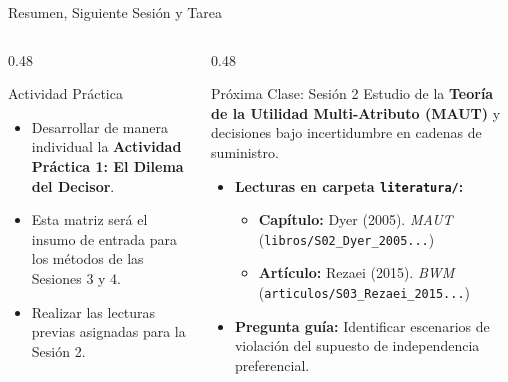 \documentclass[aspectratio=169, 10pt]{beamer}
\begin{document}
\begin{frame}{Resumen, Siguiente Sesión y Tarea}
    \begin{columns}[T]
        \begin{column}{0.48\textwidth}
            \begin{block}{Actividad Práctica}
                \begin{itemize}
                    \item Desarrollar de manera individual la \textbf{Actividad Práctica 1: El Dilema del Decisor}.
                    \item Esta matriz será el insumo de entrada para los métodos de las Sesiones 3 y 4.
                    \item Realizar las lecturas previas asignadas para la Sesión 2.
                \end{itemize}
            \end{block}
        \end{column}
        
        \begin{column}{0.48\textwidth}
            \begin{exampleblock}{Próxima Clase: Sesión 2}
                Estudio de la \textbf{Teoría de la Utilidad Multi-Atributo (MAUT)} y decisiones bajo incertidumbre en cadenas de suministro.
                \begin{itemize}
                    \scriptsize
                    \item \textbf{Lecturas en carpeta \texttt{literatura/}:}
                        \begin{itemize}
                            \tiny
                            \item \textbf{Capítulo:} Dyer (2005). \emph{MAUT} (\texttt{libros/S02\_Dyer\_2005...})
                            \item \textbf{Artículo:} Rezaei (2015). \emph{BWM} (\texttt{articulos/S03\_Rezaei\_2015...})
                        \end{itemize}
                    \item \textbf{Pregunta guía:} Identificar escenarios de violación del supuesto de independencia preferencial.
                \end{itemize}
            \end{exampleblock}
        \end{column}
    \end{columns}
\end{frame}


\closingframe
\end{document}
